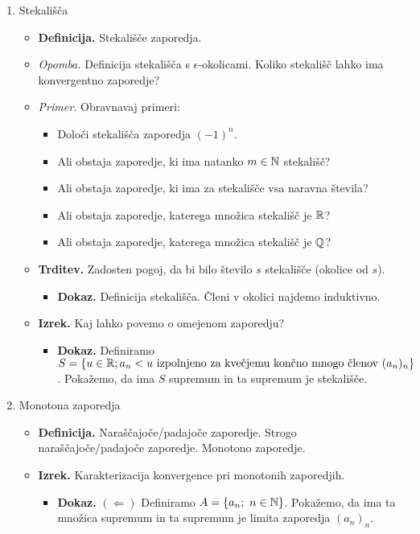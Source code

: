 \begin{enumerate}
    \item Stekališča
    \begin{itemize}
        \item \colorbox{purple!30}{\textbf{Definicija.}} Stekališče zaporedja.
        \item \colorbox{yellow!30}{\emph{Opomba.}} Definicija stekališča s $\epsilon$-okolicami. Koliko stekališč lahko ima konvergentno zaporedje?
        \item \colorbox{yellow!30}{\emph{Primer.}} Obravnavaj primeri:
        \begin{itemize}
            \item Določi stekališča zaporedja $(-1)^n$.
            \item Ali obstaja zaporedje, ki ima natanko  $m \in \mathbb{N}$ stekališč?
            \item Ali obstaja zaporedje, ki ima za stekališče vsa naravna števila?
            \item Ali obstaja zaporedje, katerega množica stekališč je $\mathbb{R}$?
            \item Ali obstaja zaporedje, katerega množica stekališč je $\mathbb{Q}$?
        \end{itemize}
        \item \colorbox{blue!30}{\textbf{Trditev.}}  Zadosten pogoj, da bi bilo število $s$ stekališče (okolice od $s$).
        \begin{itemize}
            \item \colorbox{green!30}{\textbf{Dokaz.}} Definicija stekališča. Členi v okolici najdemo induktivno.
        \end{itemize}
        \item \colorbox{blue!30}{\textbf{Izrek.}} Kaj lahko povemo o omejenom zaporedju?
        \begin{itemize}
            \item \colorbox{green!30}{\textbf{Dokaz.}} Definiramo $S = \left\{u \in \mathbb{R}; a_n < u \text{ izpolnjeno za kvečjemu končno mnogo členov } (a_n)_n\right\}$. Pokažemo, da ima $S$ supremum in ta supremum je stekališče.
        \end{itemize}
    \end{itemize}

    \item Monotona zaporedja 
    \begin{itemize}
        \item \colorbox{purple!30}{\textbf{Definicija.}} Naraščajoče/padajoče zaporedje. Strogo naraščajoče/padajoče zaporedje. Monotono zaporedje.
        \item \colorbox{blue!30}{\textbf{Izrek.}} Karakterizacija konvergence pri monotonih zaporedjih.
        \begin{itemize}
            \item \colorbox{green!30}{\textbf{Dokaz.}} $(\Leftarrow)$ Definiramo $A = \left\{a_n; \ n \in \mathbb{N}\right\}$. Pokažemo, da ima ta množica supremum in ta supremum je limita zaporedja $(a_n)_n$.
            

\end{itemize}
\end{itemize}
\end{enumerate}
